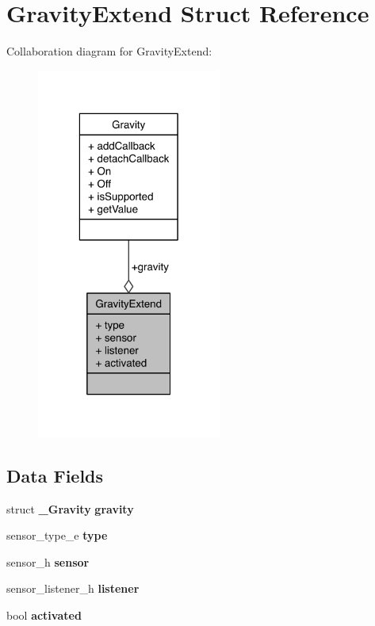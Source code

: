 \section{Gravity\-Extend Struct Reference}
\label{structGravityExtend}


Collaboration diagram for Gravity\-Extend\-:\nopagebreak
\begin{figure}[H]
\begin{center}
\leavevmode
\includegraphics[width=172pt]{structGravityExtend__coll__graph}
\end{center}
\end{figure}
\subsection*{Data Fields}
\begin{DoxyCompactItemize}
\item 
struct {\bf \-\_\-\-Gravity} {\bfseries gravity}\label{structGravityExtend_a20b0cf3dfc0a3bef728e30515beff6c1}

\item 
sensor\-\_\-type\-\_\-e {\bfseries type}\label{structGravityExtend_abf8a80847b4906232a8155b14cc81ce4}

\item 
sensor\-\_\-h {\bfseries sensor}\label{structGravityExtend_aade450fe1af8252a52d0988265e5568e}

\item 
sensor\-\_\-listener\-\_\-h {\bfseries listener}\label{structGravityExtend_a466d5e3ce0c1b61936a80070b8262d14}

\item 
bool {\bfseries activated}\label{structGravityExtend_a10519b5bee99a4e642ce476f9c60a4c9}

\end{DoxyCompactItemize}


